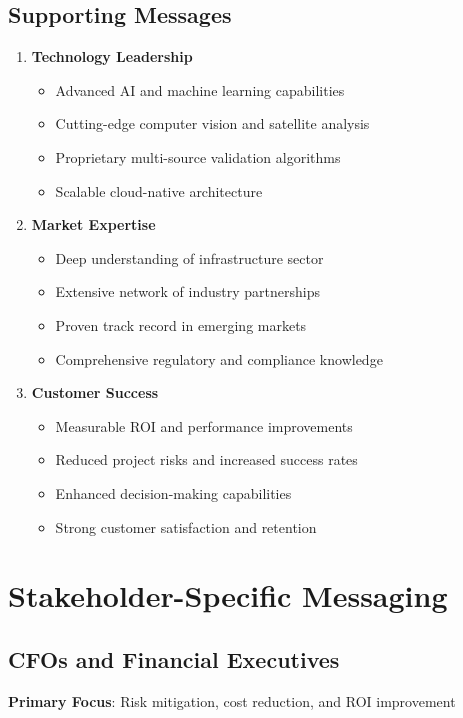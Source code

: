 \documentclass[business]{../templates/infraradar-main}
\begin{document}
\subsection{Supporting Messages}
\begin{enumerate}
    \item \textbf{Technology Leadership}
    \begin{itemize}
        \item Advanced AI and machine learning capabilities
        \item Cutting-edge computer vision and satellite analysis
        \item Proprietary multi-source validation algorithms
        \item Scalable cloud-native architecture
    \end{itemize}
    
    \item \textbf{Market Expertise}
    \begin{itemize}
        \item Deep understanding of infrastructure sector
        \item Extensive network of industry partnerships
        \item Proven track record in emerging markets
        \item Comprehensive regulatory and compliance knowledge
    \end{itemize}
    
    \item \textbf{Customer Success}
    \begin{itemize}
        \item Measurable ROI and performance improvements
        \item Reduced project risks and increased success rates
        \item Enhanced decision-making capabilities
        \item Strong customer satisfaction and retention
    \end{itemize}
\end{enumerate}

\section{Stakeholder-Specific Messaging}

\subsection{CFOs and Financial Executives}
\textbf{Primary Focus}: Risk mitigation, cost reduction, and ROI improvement
\end{document}
